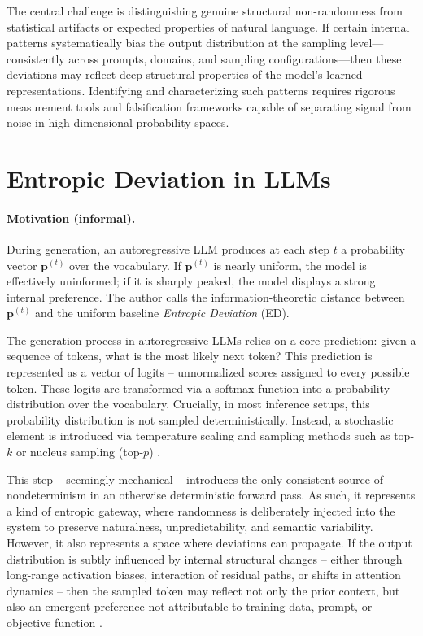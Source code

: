 \documentclass[12pt]{article}
\begin{document}
The central challenge is distinguishing genuine structural non-randomness from statistical artifacts or expected properties of natural language. If certain internal patterns systematically bias the output distribution at the sampling level---consistently across prompts, domains, and sampling configurations---then these deviations may reflect deep structural properties of the model's learned representations. Identifying and characterizing such patterns requires rigorous measurement tools and falsification frameworks capable of separating signal from noise in high-dimensional probability spaces.


\section{Entropic Deviation in LLMs}
\paragraph{Motivation (informal).} During generation, an autoregressive LLM produces at each step $t$ a probability vector $\mathbf p^{(t)}$ over the vocabulary. If $\mathbf p^{(t)}$ is nearly uniform, the model is effectively uninformed; if it is sharply peaked, the model displays a strong internal preference.  The author calls the information-theoretic distance between $\mathbf p^{(t)}$ and the uniform baseline \emph{Entropic Deviation} (ED).\label{sec:ed_llms}

The generation process in autoregressive LLMs relies on a core prediction: given a sequence of tokens, what is the most likely next token? This prediction is represented as a vector of logits -- unnormalized scores assigned to every possible token. These logits are transformed via a softmax function into a probability distribution over the vocabulary. Crucially, in most inference setups, this probability distribution is not sampled deterministically. Instead, a stochastic element is introduced via temperature scaling and sampling methods such as top-$k$ or nucleus sampling (top-$p$) \citep{bengio2013representation, brown2020language}.

This step -- seemingly mechanical -- introduces the only consistent source of nondeterminism in an otherwise deterministic forward pass. As such, it represents a kind of entropic gateway, where randomness is deliberately injected into the system to preserve naturalness, unpredictability, and semantic variability. However, it also represents a space where deviations can propagate. If the output distribution is subtly influenced by internal structural changes -- either through long-range activation biases, interaction of residual paths, or shifts in attention dynamics -- then the sampled token may reflect not only the prior context, but also an emergent preference not attributable to training data, prompt, or objective function \citep{burns2022discovering, ganguli2022predictability}.
\end{document}

